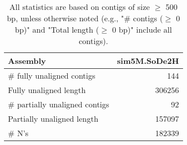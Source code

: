 \documentclass[12pt,a4paper]{article}
\begin{document}
\begin{table}[ht]
\begin{center}
\caption{All statistics are based on contigs of size $\geq$ 500 bp, unless otherwise noted (e.g., "\# contigs ($\geq$ 0 bp)" and "Total length ($\geq$ 0 bp)" include all contigs).}
\begin{tabular}{|l*{1}{|r}|}
\hline
Assembly & sim5M.SoDe2H \\ \hline
\# fully unaligned contigs & 144 \\ \hline
Fully unaligned length & 306256 \\ \hline
\# partially unaligned contigs & 92 \\ \hline
Partially unaligned length & 157097 \\ \hline
\# N's & 182339 \\ \hline
\end{tabular}
\end{center}
\end{table}
\end{document}
